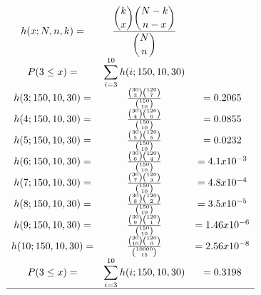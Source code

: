\documentclass[12pt, letterpaper]{article}
\begin{document}
    \begin{center}
        \begin{math}
            \begin{array}{ccc}
                h(x;N,n,k)=&\displaystyle\frac{{\displaystyle\binom{k}{x} \displaystyle\binom{N-k}{n-x}}}{\displaystyle\binom{N}{n}}&\\
                P(3\leq x)=&\displaystyle\sum^{10}_{i=3} h(i;150,10,30)&\\ 
                h(3;150,10,30)= & \frac{\binom{30}{3} \binom{120}{7}}{\binom{150}{10}}&=0.2065\\
                h(4;150,10,30)= & \frac{\binom{30}{4} \binom{120}{6}}{\binom{150}{10}}&=0.0855\\
                h(5;150,10,30)= & \frac{\binom{30}{5} \binom{120}{5}}{\binom{150}{10}}&=0.0232\\
                h(6;150,10,30)= & \frac{\binom{30}{6} \binom{120}{4}}{\binom{150}{10}}&=4.1x10^{-3}\\
                h(7;150,10,30)= & \frac{\binom{30}{7} \binom{120}{3}}{\binom{150}{10}}&=4.8x10^{-4}\\
                h(8;150,10,30)= & \frac{\binom{30}{8} \binom{120}{2}}{\binom{150}{10}}&=3.5x10^{-5}\\
                h(9;150,10,30)= & \frac{\binom{30}{9} \binom{120}{1}}{\binom{150}{10}}&=1.46x10^{-6}\\
                h(10;150,10,30)= & \frac{\binom{30}{10} \binom{120}{0}}{\binom{10000}{15}}&=2.56x10^{-8}\\
                P(3\leq x)=&\displaystyle\sum^{10}_{i=3} h(i;150,10,30)&=0.3198\\
                \hline
                \end{array}
        \end{math}\\
    \end{center}\vskip1cm 
\end{document}
